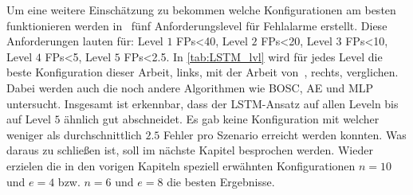     Um eine weitere Einschätzung zu bekommen welche Konfigurationen am besten funktionieren werden in~\cite{IDSTHREADGRIMMER2021} fünf Anforderungslevel für Fehlalarme erstellt.
    Diese Anforderungen lauten für: Level $1$ \acp{FP}<40, Level $2$ \acp{FP}<20, Level $3$ \acp{FP}<10, Level $4$ \acp{FP}<5, Level $5$ \acp{FP}<2.5.
    In \autoref{tab:LSTM_lvl} wird für jedes Level die beste Konfiguration dieser Arbeit, links, mit der Arbeit von~\cite{IDSTHREADGRIMMER2021}, rechts, verglichen.
    Dabei werden auch die noch andere Algorithmen wie \ac{BOSC}, \ac{AE} und \ac{MLP} untersucht.
    Insgesamt ist erkennbar, dass der \ac{LSTM}-Ansatz auf allen Leveln bis auf Level $5$ ähnlich gut abschneidet.
    Es gab keine Konfiguration mit welcher weniger als durchschnittlich $2.5$ Fehler pro Szenario erreicht werden konnten.
    Was daraus zu schließen ist, soll im nächste Kapitel besprochen werden.
    Wieder erzielen die in den vorigen Kapiteln speziell erwähnten Konfigurationen $n=10$ und $e=4$ bzw. $n=6$ und $e=8$ die besten Ergebnisse.

